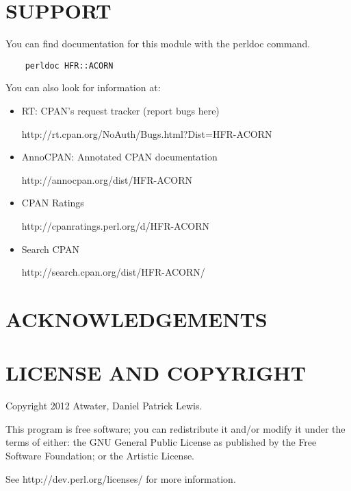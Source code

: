 \section{SUPPORT\label{SUPPORT}}


You can find documentation for this module with the perldoc command.

\begin{verbatim}
    perldoc HFR::ACORN
\end{verbatim}


You can also look for information at:

\begin{itemize}

\item RT: CPAN's request tracker (report bugs here)

\textsf{http://rt.cpan.org/NoAuth/Bugs.html?Dist=HFR-ACORN}


\item AnnoCPAN: Annotated CPAN documentation

\textsf{http://annocpan.org/dist/HFR-ACORN}


\item CPAN Ratings

\textsf{http://cpanratings.perl.org/d/HFR-ACORN}


\item Search CPAN

\textsf{http://search.cpan.org/dist/HFR-ACORN/}

\end{itemize}
\section{ACKNOWLEDGEMENTS\label{ACKNOWLEDGEMENTS}}
\section{LICENSE AND COPYRIGHT\label{LICENSE_AND_COPYRIGHT}}


Copyright 2012 Atwater, Daniel Patrick Lewis.



This program is free software; you can redistribute it and/or modify it
under the terms of either: the GNU General Public License as published
by the Free Software Foundation; or the Artistic License.



See \textsf{http://dev.perl.org/licenses/} for more information.

